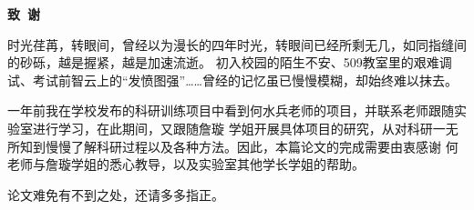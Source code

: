\newpage
\begin{center}
    \bfseries {} 致~谢
\end{center}
\par
时光荏苒，转眼间，曾经以为漫长的四年时光，转眼间已经所剩无几，如同指缝间的砂砾，越是握紧，越是加速流逝。
初入校园的陌生不安、509教室里的艰难调试、考试前智云上的“发愤图强”……曾经的记忆虽已慢慢模糊，却始终难以抹去。
\par
一年前我在学校发布的科研训练项目中看到何水兵老师的项目，并联系老师跟随实验室进行学习，在此期间，又跟随詹璇
学姐开展具体项目的研究，从对科研一无所知到慢慢了解科研过程以及各种方法。因此，本篇论文的完成需要由衷感谢
何老师与詹璇学姐的悉心教导，以及实验室其他学长学姐的帮助。
\par
论文难免有不到之处，还请多多指正。